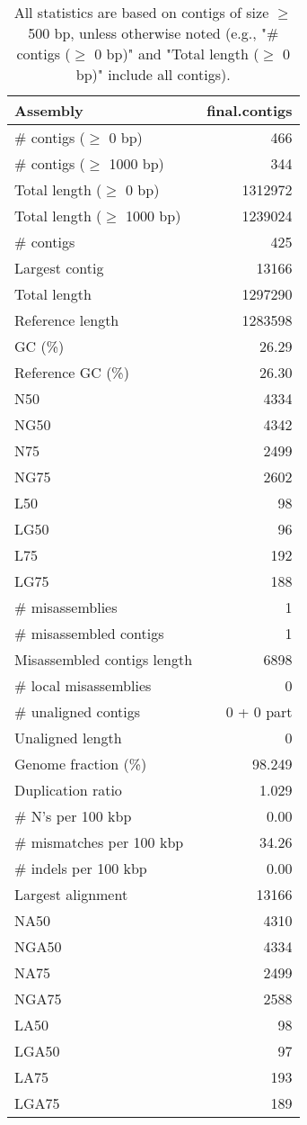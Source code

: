 \documentclass[12pt,a4paper]{article}
\begin{document}
\begin{table}[ht]
\begin{center}
\caption{All statistics are based on contigs of size $\geq$ 500 bp, unless otherwise noted (e.g., "\# contigs ($\geq$ 0 bp)" and "Total length ($\geq$ 0 bp)" include all contigs).}
\begin{tabular}{|l*{1}{|r}|}
\hline
Assembly & final.contigs \\ \hline
\# contigs ($\geq$ 0 bp) & 466 \\ \hline
\# contigs ($\geq$ 1000 bp) & 344 \\ \hline
Total length ($\geq$ 0 bp) & 1312972 \\ \hline
Total length ($\geq$ 1000 bp) & 1239024 \\ \hline
\# contigs & 425 \\ \hline
Largest contig & 13166 \\ \hline
Total length & 1297290 \\ \hline
Reference length & 1283598 \\ \hline
GC (\%) & 26.29 \\ \hline
Reference GC (\%) & 26.30 \\ \hline
N50 & 4334 \\ \hline
NG50 & 4342 \\ \hline
N75 & 2499 \\ \hline
NG75 & 2602 \\ \hline
L50 & 98 \\ \hline
LG50 & 96 \\ \hline
L75 & 192 \\ \hline
LG75 & 188 \\ \hline
\# misassemblies & 1 \\ \hline
\# misassembled contigs & 1 \\ \hline
Misassembled contigs length & 6898 \\ \hline
\# local misassemblies & 0 \\ \hline
\# unaligned contigs & 0 + 0 part \\ \hline
Unaligned length & 0 \\ \hline
Genome fraction (\%) & 98.249 \\ \hline
Duplication ratio & 1.029 \\ \hline
\# N's per 100 kbp & 0.00 \\ \hline
\# mismatches per 100 kbp & 34.26 \\ \hline
\# indels per 100 kbp & 0.00 \\ \hline
Largest alignment & 13166 \\ \hline
NA50 & 4310 \\ \hline
NGA50 & 4334 \\ \hline
NA75 & 2499 \\ \hline
NGA75 & 2588 \\ \hline
LA50 & 98 \\ \hline
LGA50 & 97 \\ \hline
LA75 & 193 \\ \hline
LGA75 & 189 \\ \hline
\end{tabular}
\end{center}
\end{table}
\end{document}
